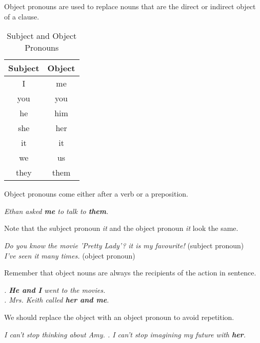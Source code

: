 \documentclass[hidelinks,10pt,a4paper]{article}
\begin{document}
Object pronouns are used to replace nouns that are the direct or indirect object of a clause.
\begin{table}[h]
\begin{center}
\begin{tabular}{|c|c|}
	\hline
	\textbf{Subject} & \textbf{Object} \\
	\hline
	I & me \\ \hline
	you & you \\ \hline
	he & him \\ \hline
	she & her \\ \hline
	it & it \\ \hline
	we & us \\ \hline
	they & them \\
	\hline
\end{tabular}
\end{center}
\caption{\label{tab:nouns5}Subject and Object Pronouns}
\end{table}

Object pronouns come either after a verb or a preposition.
\begin{center}
\textit{
Ethan asked \textbf{me} to talk to \textbf{them}.}
\end{center}

Note that the subject pronoun \textit{it} and the object pronoun \textit{it} look the same.

\begin{center}
\textit{
Do you know the movie 'Pretty Lady'? \textit{it} is my favourite!} (subject pronoun)\\
\textit{ I've seen \textit{it} many times.} (object pronoun)
\end{center}
Remember that object nouns are always the recipients of the action in sentence.
\begin{center}
\textit{
		. \textbf{He and I} went to the movies.\\
. Mrs. Keith called \textbf{her and me}.}
\end{center}

We should replace the object with an object pronoun to avoid repetition.
\begin{center}
\textit{
I can't stop thinking about Amy. . I can't stop imagining my future with \textbf{her}.}
\end{center}
\end{document}
